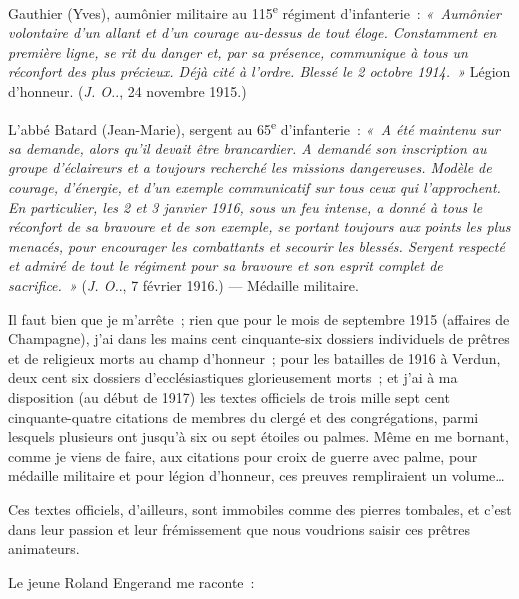 \documentclass[french,twoside]{book} %
\begin{document}
Gauthier (Yves), aumônier militaire au 115\textsuperscript{e} régiment d’infanterie : \emph{« Aumônier volontaire d’un allant et d’un courage au-dessus de tout éloge. Constamment en première ligne, se rit du danger et, par sa présence, communique à tous un réconfort des plus précieux. Déjà cité à l’ordre. Blessé le 2 octobre 1914. »} Légion d’honneur. ({\itshape J. O.}., 24 novembre 1915.)‌\par
L’abbé Batard (Jean-Marie), sergent au 65\textsuperscript{e} d’infanterie : \emph{« A été maintenu sur sa demande, alors qu’il devait être brancardier. A demandé son inscription au groupe d’éclaireurs et a toujours recherché les missions dangereuses. Modèle de courage, d’énergie, et d’un exemple communicatif sur tous ceux qui l’approchent. En particulier, les 2 et 3 janvier 1916, sous un feu intense, a donné à tous le réconfort de sa bravoure et de son exemple, se portant toujours aux points les plus menacés, pour encourager les combattants et secourir les blessés. Sergent respecté et admiré de tout le régiment pour sa bravoure et son esprit complet de sacrifice. »} ({\itshape J. O.}., 7 février 1916.) — Médaille militaire.‌\par
Il faut bien que je m’arrête ; rien que pour le mois de septembre 1915 (affaires de Champagne), j’ai dans les mains cent cinquante-six dossiers individuels de prêtres et de religieux morts au champ d’honneur ; pour les batailles de 1916 à Verdun, deux cent six dossiers d’ecclésiastiques glorieusement morts ; et j’ai à ma disposition (au début de 1917) les textes officiels de trois mille sept cent cinquante-quatre citations de membres du clergé et des congrégations, parmi lesquels plusieurs ont jusqu’à six ou sept étoiles ou palmes. Même en me bornant, comme je viens de faire, aux citations pour croix de guerre avec palme, pour médaille militaire et pour légion d’honneur, ces preuves rempliraient un volume…‌\par
Ces textes officiels, d’ailleurs, sont immobiles comme des pierres tombales, et c’est dans leur passion et leur frémissement que nous voudrions saisir ces prêtres animateurs.‌\par
Le jeune Roland Engerand me raconte :‌\par
\end{document}
